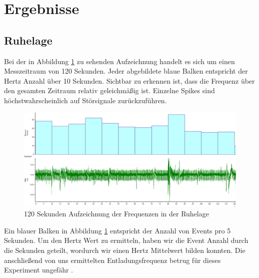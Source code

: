 \documentclass[a4paper]{article}
\begin{document}

\section{Ergebnisse}

\subsection{Ruhelage}

Bei der in Abbildung \ref{fig:A2} zu sehenden Aufzeichnung handelt es sich um einen Messzeitraum von 120 Sekunden. Jeder abgebildete blaue Balken entspricht der Hertz Anzahl über 10 Sekunden. Sichtbar zu erkennen ist, dass die Frequenz über den gesamten Zeitraum relativ geleichmäßig ist. Einzelne Spikes sind höchstwahrscheinlich auf Störsignale zurückzuführen.

\begin{figure}[H]
    \centering
    \includegraphics[scale=0.35]{images/A1_Messung.PNG}
    \caption{120 Sekunden Aufzeichnung der Frequenzen in der Ruhelage}
    \label{fig:A2}
\end{figure}

\noindent Ein blauer Balken in Abbildung \ref{fig:A2} entspricht der Anzahl von Events pro 5 Sekunden. Um den Hertz Wert zu ermitteln, haben wir die Event Anzahl durch die Sekunden geteilt, wordurch wir einen Hertz Mittelwert bilden konnten.    
Die anschließend von uns ermittelten Entladungsfrequenz betrug für dieses Experiment ungefähr .
\end{document}
